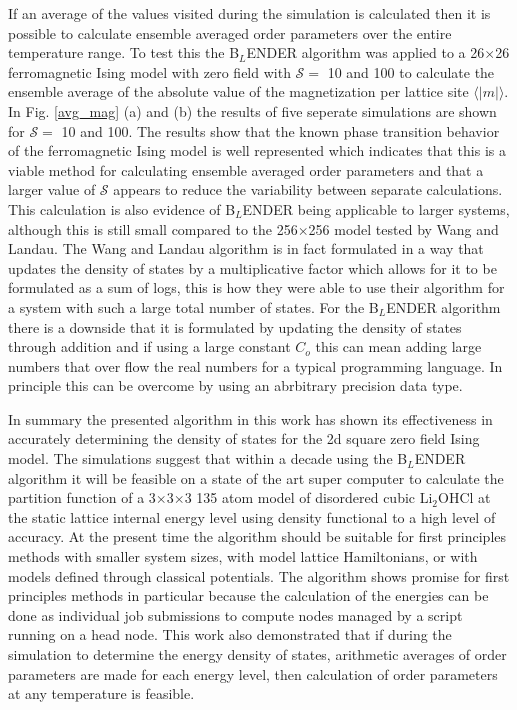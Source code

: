 \documentclass[aps,prl,reprint,superscriptaddress,showkeys]{revtex4-1}
\begin{document}
If an average of the values visited  during the simulation is calculated then it is possible to calculate ensemble averaged order parameters over the entire temperature range.  To test this the B$_L$ENDER algorithm was applied to a 26$\times$26 ferromagnetic Ising model with zero field with $\mathcal{S}=$ 10 and 100 to calculate the ensemble average of the absolute value of the magnetization per lattice site $\langle |m| \rangle$. In Fig. \ref{avg_mag} (a) and (b) the results of five seperate simulations are shown for $\mathcal{S}=$ 10 and 100.  The results show that the known phase transition behavior of the ferromagnetic Ising model is well represented which indicates that this is a viable method for calculating ensemble averaged order parameters and that a larger value of $\mathcal{S}$ appears to reduce the variability between separate calculations.  This calculation is also evidence of B$_L$ENDER being applicable to larger systems, although this is still small compared to the 256$\times$256 model tested by Wang and Landau. The Wang and Landau algorithm is in fact formulated in a way that updates the  density of states by a multiplicative factor which allows for it to be formulated as a sum of logs, this is how they were able to use their algorithm for a system with such a large total number of states.  For the B$_L$ENDER algorithm there is a downside that it is formulated by updating the  density of states through addition and if using a large constant $C_o$  this can mean adding large numbers that over flow the real numbers for a typical programming language. In principle this can be overcome by using an  abrbitrary precision data type. 

In summary the presented algorithm in this work has shown its effectiveness in accurately determining the density of states for the 2d square zero field Ising model.  The simulations suggest that within a decade using the B$_L$ENDER algorithm  it will be feasible on a state of the art super computer to calculate the partition function of a 3$\times$3$\times$3 135 atom model of disordered cubic Li$_2$OHCl at the static lattice internal energy level using  density functional to a high level of accuracy. At the present time the algorithm should be suitable for first principles methods with smaller system sizes, with model lattice Hamiltonians, or with models defined through classical potentials. The algorithm shows promise for first principles methods in particular because the calculation of the energies can be done as individual job submissions to compute nodes managed by a script running on a head node. This work also demonstrated that if during the simulation to determine the energy density of states, arithmetic  averages of order parameters are made for each energy level, then calculation of order parameters at any temperature is feasible.
 
\end{document}
